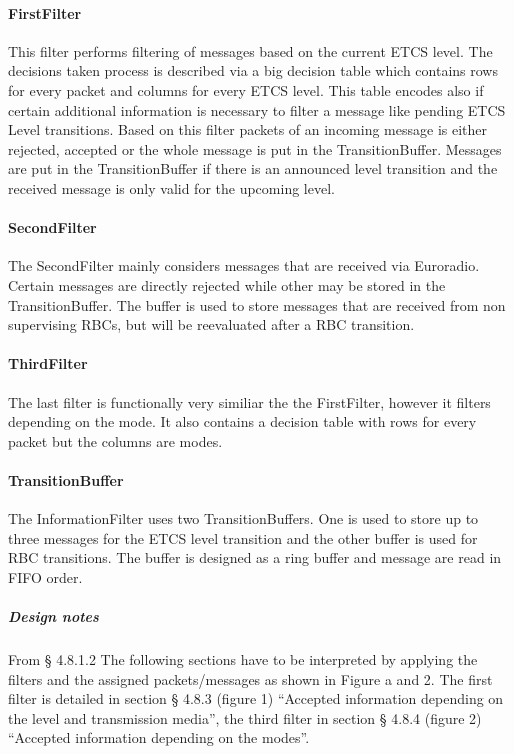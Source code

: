 \paragraph{FirstFilter} This filter performs filtering of messages
based on the current ETCS level. The decisions taken process is
described via a big decision table which contains rows for every
packet and columns for every ETCS level. This table encodes also if
certain additional information is necessary to filter a message like
pending ETCS Level transitions. Based on this filter packets of an
incoming message is either rejected, accepted or the whole message is
put in the TransitionBuffer. Messages are put in the TransitionBuffer
if there is an announced level transition and the received message is
only valid for the upcoming level.

\paragraph{SecondFilter} The SecondFilter mainly considers messages
that are received via Euroradio. Certain messages are directly
rejected while other may be stored in the TransitionBuffer. The buffer
is used to store messages that are received from non supervising RBCs,
but will be reevaluated after a RBC transition.

\paragraph{ThirdFilter} The last filter is functionally very similiar
the the FirstFilter, however it filters depending on the mode. It also
contains a decision table with rows for every packet but the columns
are modes.

\paragraph{TransitionBuffer} The InformationFilter uses two
TransitionBuffers. One is used to store up to three messages for the
ETCS level transition and the other buffer is used for RBC
transitions. The buffer is designed as a ring buffer and message are
read in FIFO order.

\subparagraph{Design notes}
From § 4.8.1.2 The following sections have to be interpreted by applying the filters and the assigned packets/messages as shown in Figure a and 2. The first filter is detailed in section § 4.8.3 (figure 1) “Accepted information depending on the level and transmission media”, the third filter in section § 4.8.4 (figure 2) “Accepted information depending on the modes”.\\

